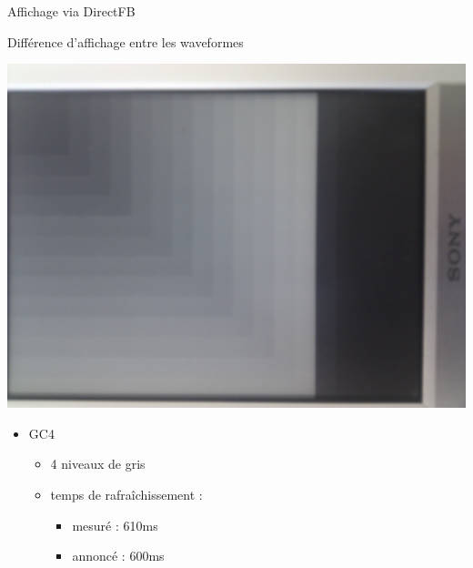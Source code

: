 \begin{frame}{ Affichage via DirectFB }
	\begin{block} { Différence d'affichage entre les waveformes }
		\parbox{0.3\linewidth}{
			\includegraphics[angle=-90,origin=c,scale=0.04]{gc4_8.jpg}
		}
		\parbox{0.6\linewidth}{
			\begin{itemize}
				\item GC4
				\begin{itemize}
					\item 4 niveaux de gris
					\item temps de rafraîchissement : 
					\begin{itemize}
						\item mesuré  : 610ms
						\item annoncé  : 600ms
					\end{itemize}		
				\end{itemize}
			\end{itemize}
		}
	\end{block}
\end{frame}
